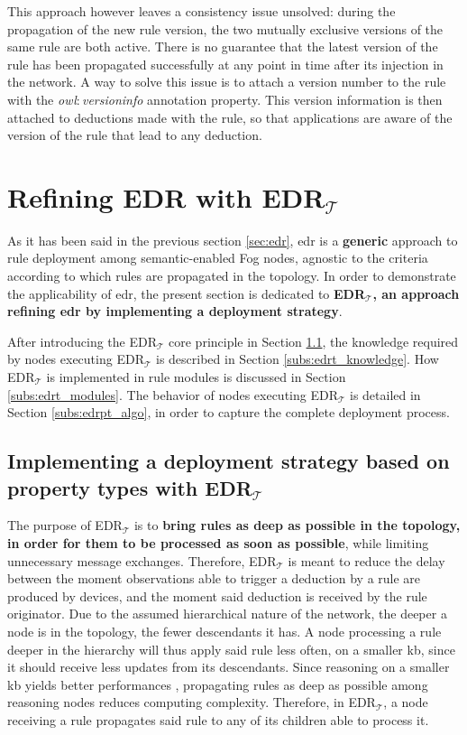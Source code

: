 \documentclass{iosart2c}
\newcommand{\edrt}{EDR$_{\mathcal{T}}$\xspace}
\newcommand{\namespace}[1]{\textit{#1$:$}}
\newcommand{\concept}[2]{\namespace{#1}\-\textit{#2}}
\begin{document}
This approach however leaves a consistency issue unsolved: during the propagation of the new rule version, the two mutually exclusive versions of the same rule are both active. 
There is no guarantee that the latest version of the rule has been propagated successfully at any point in time after its injection in the network.
A way to solve this issue is to attach a version number to the rule with the \concept{owl}{version\-info} annotation property.
This version information is then attached to deductions made with the rule, so that applications are aware of the version of the rule that lead to any deduction.

\section{Refining EDR with \edrt}
\label{sec:edrpt}

As it has been said in the previous section \textsection \ref{sec:edr}, \gls{edr} is a \textbf{generic} approach to rule deployment among semantic-enabled Fog nodes, agnostic to the criteria according to which rules are propagated in the topology.
In order to demonstrate the applicability of \gls{edr}, the present section is dedicated to \textbf{\edrt, an approach refining \gls{edr} by implementing a deployment strategy}.

After introducing the \edrt core principle in Section \textsection \ref{subs:overview_edrt}, the knowledge required by nodes executing \edrt is described in Section \textsection \ref{subs:edrt_knowledge}.
How \edrt is implemented in rule modules is discussed in Section \textsection \ref{subs:edrt_modules}.
The behavior of nodes executing \edrt is detailed in Section \textsection \ref{subs:edrpt_algo}, in order to capture the complete deployment process.

\subsection{Implementing a deployment strategy based on property types with \edrt}
\label{subs:overview_edrt}

The purpose of \edrt is to \textbf{bring rules as deep as possible in the topology, in order for them to be processed as soon as possible}, while limiting unnecessary message exchanges.
Therefore, \edrt is meant to reduce the delay between the moment observations able to trigger a deduction by a rule are produced by devices, and the moment said deduction is received by the rule originator.
Due to the assumed hierarchical nature of the network, the deeper a node is in the topology, the fewer descendants it has.
A node processing a rule deeper in the hierarchy will thus apply said rule less often, on a smaller \gls{kb}, since it should receive less updates from its descendants.
Since reasoning on a smaller \gls{kb} yields better performances \cite{Maarala2017}, propagating rules as deep as possible among reasoning nodes reduces computing complexity.
Therefore, in \edrt, a node receiving a rule propagates said rule to any of its children able to process it. 
\end{document}
